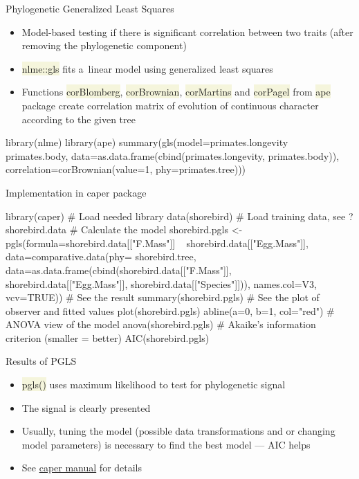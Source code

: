 \documentclass[compress, ucs, xelatex, 11pt, xcolor=svgnames, aspectratio=169,
	hyperref={
		bookmarks=true,
		unicode=true,
		colorlinks=true,
		pdftitle={Molecular data in R},
		plainpages=false,
		pdfauthor={Vojtech Zeisek},
		pdfsubject={Course about phylogeny and evolution in R},
		pdfcreator={XeLaTeX},
		pdfkeywords={R, evolution, phylogeny, molecular data},
		linkcolor=Crimson, %
		anchorcolor=Magenta, %
		citecolor=Magenta, %
		filecolor=Magenta, %
		menucolor=Magenta, %
		urlcolor=DodgerBlue, %
		pdftex},
	url={hyphens, lowtilde} %
	]{beamer}
\renewcommand{\texttt}[1]{\colorbox{Beige}{{\ttfamily #1}}}
\begin{document}
\begin{frame}[fragile]{Phylogenetic Generalized Least Squares}
	\begin{itemize}
		\item Model-based testing if there is significant correlation between two traits (after removing the phylogenetic component)
		\item \texttt{nlme::gls} fits a~linear model using generalized least squares
		\item Functions \texttt{corBlomberg}, \texttt{corBrownian}, \texttt{corMartins} and \texttt{corPagel} from \texttt{ape} package create correlation matrix of evolution of continuous character according to the given tree
	\end{itemize}
	\begin{spluscode}
    library(nlme)
    library(ape)
    summary(gls(model=primates.longevity ~ primates.body,
      data=as.data.frame(cbind(primates.longevity, primates.body)),
      correlation=corBrownian(value=1, phy=primates.tree)))
	\end{spluscode}
\end{frame}

\begin{frame}[fragile]{Implementation in caper package}
	\begin{spluscode}
    library(caper) # Load needed library
    data(shorebird) # Load training data, see ?shorebird.data
    # Calculate the model
    shorebird.pgls <- pgls(formula=shorebird.data[["F.Mass"]] ~
      shorebird.data[["Egg.Mass"]], data=comparative.data(phy=
      shorebird.tree, data=as.data.frame(cbind(shorebird.data[["F.Mass"]],
      shorebird.data[["Egg.Mass"]], shorebird.data[["Species"]])),
      names.col=V3, vcv=TRUE))
    # See the result
    summary(shorebird.pgls)
    # See the plot of observer and fitted values
    plot(shorebird.pgls)
    abline(a=0, b=1, col="red")
    # ANOVA view of the model
    anova(shorebird.pgls)
    # Akaike's information criterion (smaller = better)
    AIC(shorebird.pgls)
	\end{spluscode}
\end{frame}

\begin{frame}{Results of PGLS}
	\begin{multicols}{2}
		\texttt{[image: shorebirds.png]}
		\begin{itemize}
			\item \texttt{pgls()} uses maximum likelihood to test for phylogenetic signal
			\item The signal is clearly presented
			\item Usually, tuning the model (possible data transformations and or changing model parameters) is necessary to find the best model --- AIC helps
			\item See \href{https://CRAN.R-project.org/package=caper}{caper manual} for details
		\end{itemize}
	\end{multicols}
\end{frame}
\end{document}
